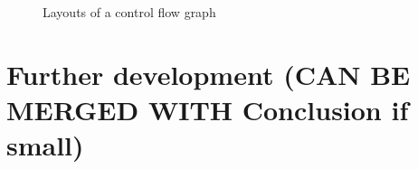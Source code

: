 \documentclass[conference]{IEEEtran}
\begin{document}
\begin{figure}[b]
\begin{minipage}[b]{0.49\linewidth}
	\end{minipage}
	\caption{Layouts of a control flow graph}
	\label{fig:image1}
\end{figure}


\section{Further development (CAN BE MERGED WITH Conclusion if small)}
\label{sec:further-development}
\end{document}
